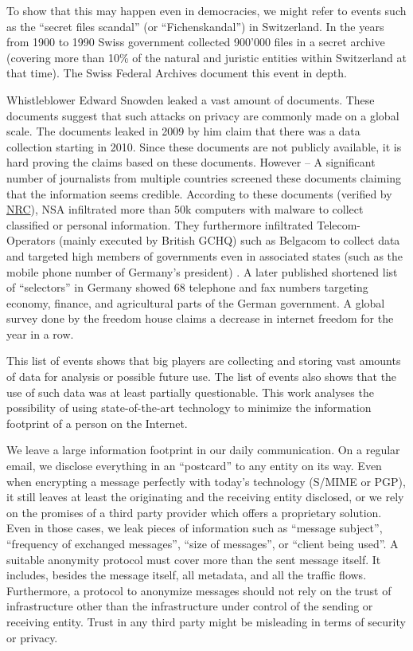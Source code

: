 To show that this may happen even in democracies, we might refer to events such as the ``secret files scandal'' (or  ``Fichenskandal'') in Switzerland. In the years from 1900 to 1990 Swiss government collected 900’000 files in a secret archive (covering more than 10\% of the natural and juristic entities within Switzerland at that time). The Swiss Federal Archives document this event in depth\cite{Leuenberger1989}.

Whistleblower Edward Snowden leaked a vast amount of documents. These documents suggest that such attacks on privacy are commonly made on a global scale. The documents leaked in 2009 by him claim that there was a data collection starting in 2010. Since these documents are not publicly available, it is hard proving the claims based on these documents. However -- A significant number of journalists from multiple countries screened these documents claiming that the information seems credible. According to these documents (verified by \href{http://www.nrc.nl/nieuws/2013/11/23/nederland-sinds-1946-doelwit-van-nsa}{NRC}), NSA infiltrated more than 50k computers with malware to collect classified or personal information. They furthermore infiltrated Telecom-Operators (mainly executed by British GCHQ) such as Belgacom to collect data and targeted high members of governments even in associated states (such as the mobile phone number of Germany's president) \cite{NCR2013,XKeyscore,Ball2013,Ackerman2013,Greenberg2013}. A later published shortened list of ``selectors'' in Germany showed 68 telephone and fax numbers targeting economy, finance, and agricultural parts of the German government. A global survey done by the freedom house\cite{FOTN2018} claims a decrease in internet freedom for the  year in a row. 

This list of events shows that big players are collecting and storing vast amounts of data for analysis or possible future use. The list of events also shows that the use of such data was at least partially questionable. This work analyses the possibility of using state-of-the-art technology to minimize the information footprint of a person on the Internet. 

We leave a large information footprint in our daily communication. On a regular email, we disclose everything in an ``postcard'' to any entity on its way. Even when encrypting a message perfectly with today's technology (S/MIME\cite{RFC2045} or PGP\cite{RFC2015}), it still leaves at least the originating and the receiving entity disclosed, or we rely on the promises of a third party provider which offers a proprietary solution. Even in those cases, we leak pieces of information such as ``message subject'', ``frequency of exchanged messages'', ``size of messages'', or ``client being used''. A suitable anonymity protocol must cover more than the sent message itself. It includes, besides the message itself, all metadata, and all the traffic flows. Furthermore, a protocol to anonymize messages should not rely on the trust of infrastructure other than the infrastructure under control of the sending or receiving entity. Trust in any third party might be misleading in terms of security or privacy.

